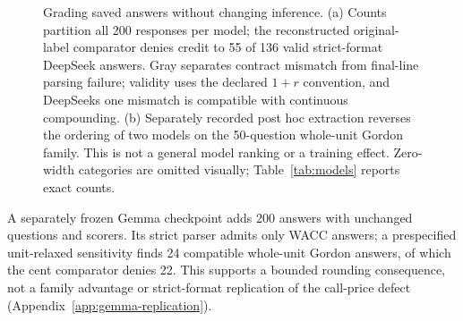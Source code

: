 \begin{figure}[!ht]
\caption{Grading saved answers without changing inference. (a) Counts partition all 200 responses per model; the reconstructed original-label comparator denies credit to 55 of 136 valid strict-format DeepSeek answers. Gray separates contract mismatch from final-line parsing failure; validity uses the declared $1+r$ convention, and DeepSeek\textquotesingle s one mismatch is compatible with continuous compounding. (b) Separately recorded post hoc extraction reverses the ordering of two models on the 50-question whole-unit Gordon family. This is not a general model ranking or a training effect. Zero-width categories are omitted visually; Table~\ref{tab:models} reports exact counts.}
\label{fig:grading-evidence}
\end{figure}

A separately frozen Gemma checkpoint adds 200 answers with unchanged questions and scorers. Its strict parser admits only WACC answers; a prespecified unit-relaxed sensitivity finds 24 compatible whole-unit Gordon answers, of which the cent comparator denies 22. This supports a bounded rounding consequence, not a family advantage or strict-format replication of the call-price defect (Appendix~\ref{app:gemma-replication}).

